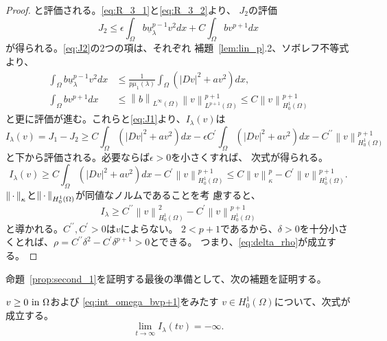 \begin{proof}
 と評価される。\eqref{eq:R_3_1}と\eqref{eq:R_3_2}より、
 $J_2$の評価
 \begin{equation}
  J_2 \leq \epsilon \int_\Omega b \underline{u}_\lambda^{p-1} v^2 dx +
   C \int_\Omega b v^{p+1} dx \label{eq:J2}
 \end{equation}
 が得られる。\eqref{eq:J2}の$2$つの項は、それぞれ
 補題~\ref{lem:lin_p}.2、ソボレフ不等式より、
 \begin{align*}
  \int_\Omega b\underline{u}_\lambda^{p-1} v^2 dx &\leq
  \frac{1}{p\mu_1(\lambda)} \int_\Omega \left( \lvert Dv \rvert^2 +
  av^2 \right) dx, \\
  \int_\Omega bv^{p+1} dx &\leq \left\| b \right\|_{L^\infty(\Omega)}
  \left\| v \right\|_{L^{p+1}(\Omega)}^{p+1} \leq C \left\| v
  \right\|_{H_0^1(\Omega)}^{p+1}
 \end{align*}
 と更に評価が進む。これらと\eqref{eq:J1}より、$I_\lambda(v)$は
 \[
  I_\lambda(v) = J_1 - J_2 \geq C \int_\Omega \left( \lvert Dv
 \rvert^2 + a v^2 \right) dx - \epsilon C^\prime \int_\Omega \left(
 \lvert Dv \rvert^2 + av^2 \right) dx - C^{\prime\prime} \left\| v \right\|^{p+1}_{H_0^1(\Omega)}
 \]
 と下から評価される。必要ならば$\epsilon > 0$を小さくすれば、
 次式が得られる。
 \[
  I_\lambda (v) \geq C \int_\Omega \left( \lvert Dv \rvert^2 + av^2
 \right) dx - C^\prime \left\| v \right\|_{H_0^1(\Omega)}^{p+1} \leq C
 \left\| v \right\|_{\kappa}^p - C^\prime \left\| v
 \right\|^{p+1}_{H_0^1(\Omega)}.
 \]
 $\left\|\, \cdot \, \right\|_\kappa$と$\left\|\, \cdot \, \right\|_{H_0^1(\Omega)}$が同値なノルムであることを考
 慮すると、
 \[
  I_\lambda \geq C^{\prime\prime} \left\| v \right\|_{H_0^1(\Omega)}^2
 - C^{\prime} \left\| v \right\|_{H_0^1(\Omega)}^{p+1}
 \]
 と導かれる。$C^{\prime\prime}, C^\prime > 0$は$v$によらない。
 $2 < p+1$であるから、$\delta > 0$を十分小さくとれば、$\rho =
 C^{\prime\prime} \delta^2 - C^{\prime} \delta^{p+1} > 0$とできる。
 つまり、\eqref{eq:delta_rho}が成立する。 \qedhere
\end{proof}

命題~\ref{prop:second_1}を証明する最後の準備として、次の補題を証明する。

\begin{lem} \label{lem:mountain_dec}
 $v \geq 0 ~\text{in}~ \Omega$および
 \eqref{eq:int_omega_bvp+1}をみたす
 $v \in H_0^1(\Omega)$について、次式が成立する。
 \begin{equation}
  \lim_{t \to \infty} I_\lambda(tv) =  -\infty. \label{eq:mountain_dec}
 \end{equation}
\end{lem}

